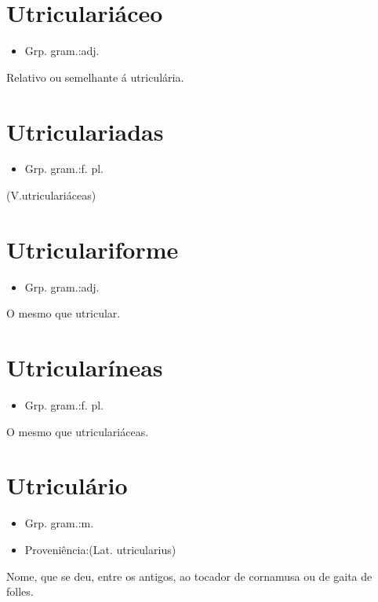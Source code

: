 \documentclass{article}
\begin{document}
\section{Utriculariáceo}
\begin{itemize}
\item {Grp. gram.:adj.}
\end{itemize}
Relativo ou semelhante á utriculária.
\section{Utriculariadas}
\begin{itemize}
\item {Grp. gram.:f. pl.}
\end{itemize}
(V.utriculariáceas)
\section{Utriculariforme}
\begin{itemize}
\item {Grp. gram.:adj.}
\end{itemize}
O mesmo que \textunderscore utricular\textunderscore .
\section{Utricularíneas}
\begin{itemize}
\item {Grp. gram.:f. pl.}
\end{itemize}
O mesmo que \textunderscore utriculariáceas\textunderscore .
\section{Utriculário}
\begin{itemize}
\item {Grp. gram.:m.}
\end{itemize}
\begin{itemize}
\item {Proveniência:(Lat. \textunderscore utricularius\textunderscore )}
\end{itemize}
Nome, que se deu, entre os antigos, ao tocador de cornamusa ou de gaita de folles.
\end{document}
